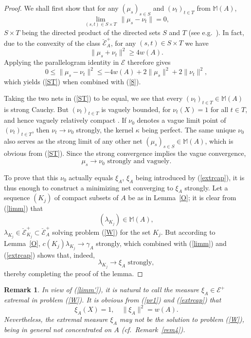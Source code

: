\documentclass[12pt,a4paper,reqno]{amsart} %
\theoremstyle{lause}
\theoremstyle{maaritelma}
\theoremstyle{lause}
\theoremstyle{maaritelma}
\newtheorem{remark}[theorem]{Remark}
\numberwithin{equation}{section}
\begin{document}
\begin{proof} We shall first show that for any $(\mu_s)_{s\in S}$ and $(\nu_t)_{t\in T}$
from $\mathbb M(A)$,
\begin{equation}\label{ST}
\lim_{(s,t)\in S\times T}\,\|\mu_s-\nu_t\|=0,
\end{equation}
$S\times T$ being the directed product of the directed sets $S$ and
$T$ (see e.g.\ \cite[p.~68]{K}).
In fact, due to the convexity of the class $\breve{\mathcal E}^+_A$, for any $(s,t)\in S\times T$ we have
\[\|\mu_s+\nu_t\|^2\geqslant4w(A).\]
Applying the parallelogram identity in $\mathcal E$ therefore gives
\[
0\leqslant\|\mu_s-\nu_t\|^2\leqslant-4w(A)+2\|\mu_s\|^2+2\|\nu_t\|^2,\]
which yields (\ref{ST}) when combined with (\ref{8}).

Taking the two nets in (\ref{ST}) to be equal, we see that every $(\nu_t)_{t\in T}\in\mathbb M(A)$ is strong Cauchy. But $(\nu_t)_{t\in T}$ is vaguely bounded, for $\nu_t(X)=1$ for all $t\in T$, and hence vaguely relatively compact \cite[Section~III.1.9, Proposition~15]{B2}. If $\nu_0$ denotes a vague limit point of $(\nu_t)_{t\in T}$, then  $\nu_t\to\nu_0$ strongly, the kernel $\kappa$ being perfect. The same unique $\nu_0$ also serves as the strong limit of any other net $(\mu_s)_{s\in S}\in\mathbb M(A)$, which is obvious from (\ref{ST}). Since the strong convergence implies the vague convergence,
\[\mu_s\to\nu_0\text{ \ strongly and vaguely}.\]

To prove that this $\nu_0$ actually equals $\xi_A$, $\xi_A$ being introduced by (\ref{extrcap}), it is thus enough to construct a minimizing net converging to $\xi_A$ strongly. Let a sequence $(K_j)$ of compact subsets of $A$ be as in Lemma~\ref{O}; it is clear from (\ref{limm}) that
\[(\lambda_{K_j})\in\mathbb M(A),\]
$\lambda_{K_j}\in\breve{\mathcal E}^+_{K_j}\subset\breve{\mathcal E}^+_A$ solving problem (\ref{W}) for the set $K_j$. But according to Lemma~\ref{O},
$c(K_j)\lambda_{K_j}\to\gamma_A$ strongly, which combined with (\ref{limm}) and (\ref{extrcap}) shows that, indeed,
\[\lambda_{K_j}\to\xi_A\text{ \ strongly},\]
thereby completing the proof of the lemma.
\end{proof}

\begin{remark}\label{extr-rem}
In view of (\ref{limm'}), it is natural to call the measure $\xi_A\in\mathcal E^+$ {\it extremal\/} in problem (\ref{W}). It is obvious from (\ref{pr1}) and (\ref{extrcap}) that
\begin{equation}\label{and}\xi_A(X)=1,\quad\|\xi_A\|^2=w(A).\end{equation}
Nevertheless, the extremal measure $\xi_A$ may not be the solution to problem (\ref{W}), being in general not concentrated on $A$ (cf.\  Remark~\ref{rem4}).
 \end{remark}
\end{document}
